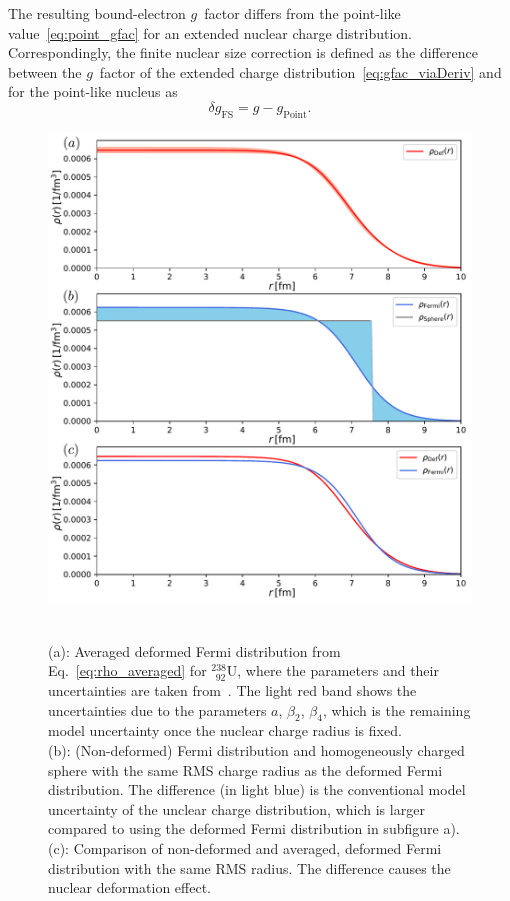 The resulting bound-electron $g$~factor differs from the point-like value~\eqref{eq:point_gfac} for an extended nuclear charge distribution. Correspondingly, the finite nuclear size correction is defined as the difference between the $g$~factor of the extended charge distribution~\eqref{eq:gfac_viaDeriv} and for the point-like nucleus as
\begin{equation}
\delta g_{\text{FS}}=g-g_{\text{Point}}.
\end{equation}
%
\begin{figure}
\centering
\includegraphics[width=\textwidth]{pics/chargeDistr2.pdf}\\
\caption{\label{fig:charge distr.}\\
(a): Averaged deformed Fermi distribution from Eq.~\eqref{eq:rho_averaged} for $^{238}_{\;\,92}$U, where the parameters and their uncertainties are taken from~\cite{jacek2012}. The light red band shows the uncertainties due to the parameters $a$, $\beta_2$, $\beta_4$, which is the remaining model uncertainty once the nuclear charge radius is fixed.\\
(b): (Non-deformed) Fermi distribution and homogeneously charged sphere with the same RMS charge radius as the deformed Fermi distribution. The difference (in light blue) is the conventional model uncertainty of the unclear charge distribution, which is larger compared to using the deformed Fermi distribution in subfigure a).\\
(c): Comparison of non-deformed and averaged, deformed Fermi distribution with the same RMS radius. The difference causes the nuclear deformation effect.}
\end{figure}
%
